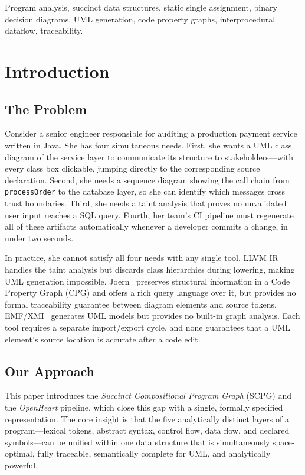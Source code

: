 \documentclass[journal,10pt,twoside]{IEEEtran}
\begin{document}
\begin{IEEEkeywords}
Program analysis, succinct data structures, static single
assignment, binary decision diagrams, UML generation,
code property graphs, interprocedural dataflow, traceability.
\end{IEEEkeywords}

\section{Introduction}\label{sec:intro}

\subsection{The Problem}

Consider a senior engineer responsible for auditing a
production payment service written in Java.  She has four
simultaneous needs.  First, she wants a UML class diagram of
the service layer to communicate its structure to
stakeholders---with every class box clickable, jumping
directly to the corresponding source declaration.  Second, she
needs a sequence diagram showing the call chain from
\texttt{processOrder} to the database layer, so she can
identify which messages cross trust boundaries.  Third, she
needs a taint analysis that proves no unvalidated user input
reaches a SQL query.  Fourth, her team's CI pipeline must
regenerate all of these artifacts automatically whenever a
developer commits a change, in under two seconds.

In practice, she cannot satisfy all four needs with any single
tool.  LLVM IR~\cite{lattner04} handles the taint analysis but
discards class hierarchies during lowering, making UML
generation impossible.  Joern~\cite{yamaguchi14} preserves
structural information in a Code Property Graph (CPG) and
offers a rich query language over it, but provides no formal
traceability guarantee between diagram
elements and source tokens.  EMF/XMI~\cite{emf} generates
UML models but provides no built-in graph analysis.  Each
tool requires a separate import/export cycle, and none
guarantees that a UML element's source location is accurate
after a code edit.

\subsection{Our Approach}

This paper introduces the \textit{Succinct Compositional
Program Graph} (SCPG) and the \textit{OpenHeart} pipeline,
which close this gap with a single, formally specified
representation.  The core insight is that the five
analytically distinct layers of a program---lexical tokens,
abstract syntax, control flow, data flow, and declared
symbols---can be unified within one data structure that is
simultaneously space-optimal, fully traceable, semantically
complete for UML, and analytically powerful.
\end{document}
